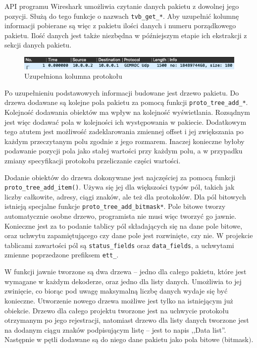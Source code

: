 \documentclass[a4paper, 12pt, twoside, openright]{article}
\begin{document}
	API programu Wireshark umożliwia czytanie danych pakietu z dowolnej jego pozycji. Służą do tego funkcje o nazwach \texttt{tvb\_get\_*}.
	Aby uzupełnić kolumnę informacji pobierane są więc z pakietu ilości danych i numeru porządkowego pakietu. Ilość danych jest także niezbędna
	w późniejszym etapie ich ekstrakcji z sekcji danych pakietu.

	\begin{figure}[h]
		\centering
			\includegraphics[width=1.0\textwidth]{img/screenshot_col.png}
		\caption{Uzupełniona kolumna protokołu}
		\label{fig:col}
	\end{figure}

	Po uzupełnieniu podstawowych informacji budowane jest drzewo pakietu. Do drzewa dodawane są kolejne pola pakietu za pomocą
	funkcji \texttt{proto\_tree\_add\_*}. Kolejność dodawania obiektów ma wpływ na kolejność wyświetlania. Rozsądnym jest więc
	dodawać pola w kolejności ich występowania w pakiecie. Dodatkowym tego atutem jest możliwość zadeklarowania zmiennej offset
	i jej zwiększania po każdym przeczytanym polu zgodnie z jego rozmarem. Inaczej konieczne byłoby podawanie pozycji pola jako
	stałej wartości przy każdym polu, a w przypadku zmiany specyfikacji protokołu przeliczanie części wartości.

	Dodanie obiektów do drzewa dokonywane jest najczęściej za pomocą funkcji \texttt{proto\_tree\_add\_item()}.
	Używa się jej dla większości typów pól, takich jak liczby całkowite, adresy, ciągi znaków, ale też dla protokołów.
	Dla pól bitowych istnieją specjalne funkcje \texttt{proto\_tree\_add\_bitmask*}. Pole bitowe tworzy automatycznie
	osobne drzewo, programista nie musi więc tworzyć go jawnie. Konieczne jest za to podanie tablicy pól składających
	się na dane pole bitowe, oraz uchwytu zapamiętującego czy dane pole jest rozwinięte, czy nie. W projekcie tablicami
	zawartości pól są \texttt{status\_fields} oraz \texttt{data\_fields}, a uchwytami zmienne poprzedzone prefiksem \texttt{ett\_}.

	W funkcji jawnie tworzone są dwa drzewa -- jedno dla całego pakietu, które jest wymagane w każdym dekoderze, oraz jedno
	dla listy danych. Umożliwia to jej zwinięcie, co biorąc pod uwagę maksymalną liczbę danych wydaje się być konieczne.
	Utworzenie nowego drzewa możliwe jest tylko na istniejącym już obiekcie. Drzewo dla całego projektu
	tworzone jest na uchwycie protokołu otrzymanym po jego rejestracji, natomiast drzewo dla listy danych tworzone jest na dodanym
	ciągu znaków podpisującym listę -- jest to napis ,,Data list''. Następnie w pętli dodawane są do niego dane pakietu jako pola bitowe $($bitmask$)$.
\end{document}
